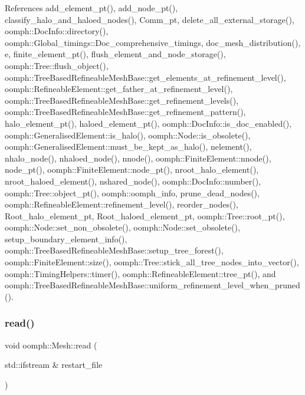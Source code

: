References add\+\_\+element\+\_\+pt(), add\+\_\+node\+\_\+pt(), classify\+\_\+halo\+\_\+and\+\_\+haloed\+\_\+nodes(), Comm\+\_\+pt, delete\+\_\+all\+\_\+external\+\_\+storage(), oomph\+::\+Doc\+Info\+::directory(), oomph\+::\+Global\+\_\+timings\+::\+Doc\+\_\+comprehensive\+\_\+timings, doc\+\_\+mesh\+\_\+distribution(), e, finite\+\_\+element\+\_\+pt(), flush\+\_\+element\+\_\+and\+\_\+node\+\_\+storage(), oomph\+::\+Tree\+::flush\+\_\+object(), oomph\+::\+Tree\+Based\+Refineable\+Mesh\+Base\+::get\+\_\+elements\+\_\+at\+\_\+refinement\+\_\+level(), oomph\+::\+Refineable\+Element\+::get\+\_\+father\+\_\+at\+\_\+refinement\+\_\+level(), oomph\+::\+Tree\+Based\+Refineable\+Mesh\+Base\+::get\+\_\+refinement\+\_\+levels(), oomph\+::\+Tree\+Based\+Refineable\+Mesh\+Base\+::get\+\_\+refinement\+\_\+pattern(), halo\+\_\+element\+\_\+pt(), haloed\+\_\+element\+\_\+pt(), oomph\+::\+Doc\+Info\+::is\+\_\+doc\+\_\+enabled(), oomph\+::\+Generalised\+Element\+::is\+\_\+halo(), oomph\+::\+Node\+::is\+\_\+obsolete(), oomph\+::\+Generalised\+Element\+::must\+\_\+be\+\_\+kept\+\_\+as\+\_\+halo(), nelement(), nhalo\+\_\+node(), nhaloed\+\_\+node(), nnode(), oomph\+::\+Finite\+Element\+::nnode(), node\+\_\+pt(), oomph\+::\+Finite\+Element\+::node\+\_\+pt(), nroot\+\_\+halo\+\_\+element(), nroot\+\_\+haloed\+\_\+element(), nshared\+\_\+node(), oomph\+::\+Doc\+Info\+::number(), oomph\+::\+Tree\+::object\+\_\+pt(), oomph\+::oomph\+\_\+info, prune\+\_\+dead\+\_\+nodes(), oomph\+::\+Refineable\+Element\+::refinement\+\_\+level(), reorder\+\_\+nodes(), Root\+\_\+halo\+\_\+element\+\_\+pt, Root\+\_\+haloed\+\_\+element\+\_\+pt, oomph\+::\+Tree\+::root\+\_\+pt(), oomph\+::\+Node\+::set\+\_\+non\+\_\+obsolete(), oomph\+::\+Node\+::set\+\_\+obsolete(), setup\+\_\+boundary\+\_\+element\+\_\+info(), oomph\+::\+Tree\+Based\+Refineable\+Mesh\+Base\+::setup\+\_\+tree\+\_\+forest(), oomph\+::\+Finite\+Element\+::size(), oomph\+::\+Tree\+::stick\+\_\+all\+\_\+tree\+\_\+nodes\+\_\+into\+\_\+vector(), oomph\+::\+Timing\+Helpers\+::timer(), oomph\+::\+Refineable\+Element\+::tree\+\_\+pt(), and oomph\+::\+Tree\+Based\+Refineable\+Mesh\+Base\+::uniform\+\_\+refinement\+\_\+level\+\_\+when\+\_\+pruned().

\mbox{\label{classoomph_1_1Mesh_ac192b41d1a24297ff38854548defd92b}} 
\subsubsection{\texorpdfstring{read()}{read()}}
{\footnotesize\ttfamily void oomph\+::\+Mesh\+::read (\begin{DoxyParamCaption}\item[{std\+::ifstream \&}]{restart\+\_\+file }\end{DoxyParamCaption})\hspace{0.3cm}{\ttfamily [virtual]}}



